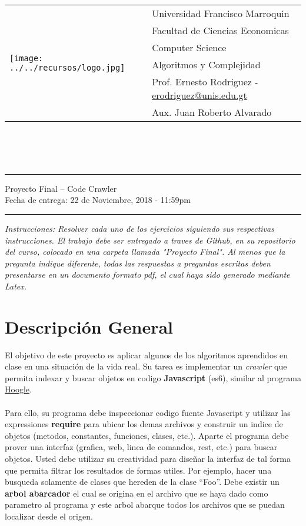 \documentclass{article}
\newcommand{\horrule}[1]{\rule{\linewidth}{#1}}
\begin{document}
\begin{tabular}{l l}
\multirow{6}{*}{\texttt{[image: ../../recursos/logo.jpg]}}
 & Universidad Francisco Marroquin \\
 & Facultad de Ciencias Economicas \\
 & Computer Science \\
 & Algoritmos y Complejidad \\
 & Prof. Ernesto Rodriguez - \href{mailto:erodriguez@unis.edu.gt}{erodriguez@unis.edu.gt} \\
 & Aux. Juan Roberto Alvarado
\end{tabular}
\\\\\\

\begin{center}
        \horrule{0.5pt}
        \huge{Proyecto Final -- Code Crawler} \\
        \large{Fecha de entrega: 22 de Noviembre, 2018 - 11:59pm} \\
        \horrule{1pt}
\end{center}

\emph{Instrucciones: Resolver cada uno de los ejercicios siguiendo sus respectivas
instrucciones. El trabajo debe ser entregado a traves de Github, en su repositorio del curso, colocado en una
carpeta llamada "Proyecto Final". Al menos que la pregunta indique diferente, todas las
respuestas a preguntas escritas deben presentarse en un documento formato pdf, el cual
haya sido generado mediante Latex. }
\section{Descripci\'on General}
El objetivo de este proyecto es aplicar algunos de los algoritmos aprendidos en clase en
una situaci\'on de la vida real. Su tarea es implementar un \emph{crawler} que permita
indexar y buscar objetos en codigo {\bf Javascript} (es6), similar al programa \href{https://www.haskell.org/hoogle/}{Hoogle}.
\\\\
Para ello, su programa debe inspeccionar codigo fuente Javascript y utilizar las expressiones
{\bf require} para ubicar los demas archivos y construir un indice de objetos (metodos, constantes,
funciones, clases, etc.). Aparte el programa debe prover una interfaz (grafica, web, linea de comandos,
rest, etc.) para buscar objetos. Usted debe utilizar su creatividad para dise\~nar la interfaz de
tal forma que permita filtrar los resultados de formas utiles. Por ejemplo, hacer una busqueda solamente
de clases que hereden de la clase ``Foo''. Debe existir un {\bf arbol abarcador} el cual se origina en
el archivo que se haya dado como parametro al programa y este arbol abarque todos los archivos que se
puedan localizar desde el origen.
\end{document}
